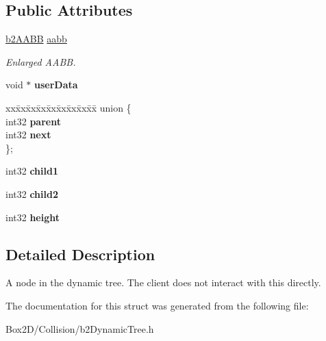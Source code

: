 \subsection*{Public Attributes}
\begin{DoxyCompactItemize}
\item 
\mbox{\label{structb2_tree_node_a798f1a594b33c713be45e76e79912239}} 
\hyperlink{structb2_a_a_b_b}{b2\+A\+A\+BB} \hyperlink{structb2_tree_node_a798f1a594b33c713be45e76e79912239}{aabb}
\begin{DoxyCompactList}\small\item\em Enlarged A\+A\+BB. \end{DoxyCompactList}\item 
\mbox{\label{structb2_tree_node_aff77b3eb48326aca1b0762f5c45e56e7}} 
void $\ast$ {\bfseries user\+Data}
\item 
\mbox{\label{structb2_tree_node_a9d8975d1e109fb59c7f549f1da7d75c4}} 
\begin{tabbing}
xx\=xx\=xx\=xx\=xx\=xx\=xx\=xx\=xx\=\kill
union \{\\
\>int32 {\bfseries parent}\\
\>int32 {\bfseries next}\\
\}; \\

\end{tabbing}\item 
\mbox{\label{structb2_tree_node_a3a320f2afc7d223e92ee3629602be5ca}} 
int32 {\bfseries child1}
\item 
\mbox{\label{structb2_tree_node_aa6774ce329715b20d8b7cc8b6e3d50bc}} 
int32 {\bfseries child2}
\item 
\mbox{\label{structb2_tree_node_acd183ac94a8d44195c787111be4c22e2}} 
int32 {\bfseries height}
\end{DoxyCompactItemize}


\subsection{Detailed Description}
A node in the dynamic tree. The client does not interact with this directly. 

The documentation for this struct was generated from the following file\+:\begin{DoxyCompactItemize}
\item 
Box2\+D/\+Collision/b2\+Dynamic\+Tree.\+h\end{DoxyCompactItemize}

